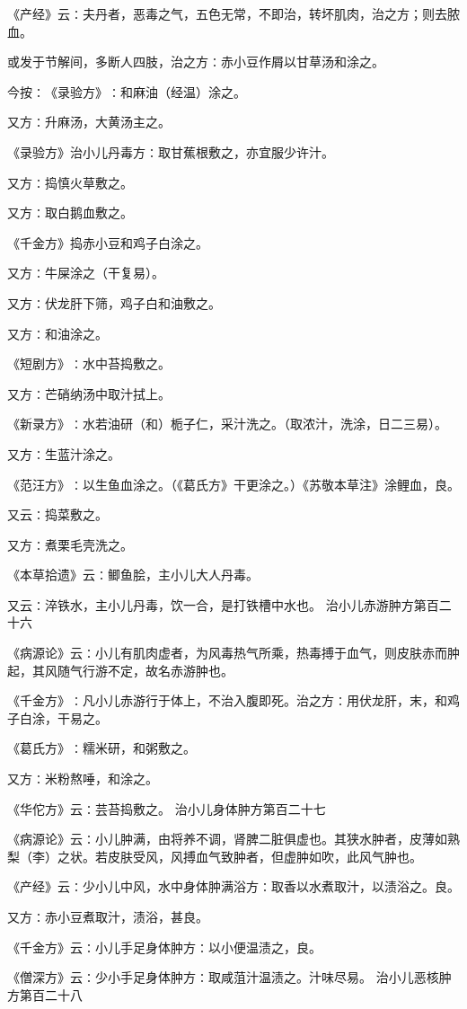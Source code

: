\documentclass[a4paper,12pt,UTF8,twoside]{ctexbook}
\begin{document}
《产经》云∶夫丹者，恶毒之气，五色无常，不即治，转坏肌肉，治之方；则去脓血。

或发于节解间，多断人四肢，治之方∶赤小豆作屑以甘草汤和涂之。

今按∶《录验方》∶和麻油（经温）涂之。

又方∶升麻汤，大黄汤主之。

《录验方》治小儿丹毒方∶取甘蕉根敷之，亦宜服少许汁。

又方∶捣慎火草敷之。

又方∶取白鹅血敷之。

《千金方》捣赤小豆和鸡子白涂之。

又方∶牛屎涂之（干复易）。

又方∶伏龙肝下筛，鸡子白和油敷之。

又方∶和油涂之。

《短剧方》∶水中苔捣敷之。

又方∶芒硝纳汤中取汁拭上。

《新录方》∶水若油研（和）栀子仁，采汁洗之。（取浓汁，洗涂，日二三易）。

又方∶生蓝汁涂之。

《范汪方》∶以生鱼血涂之。（《葛氏方》干更涂之。）《苏敬本草注》涂鲤血，良。

又云∶捣菜敷之。

又方∶煮栗毛壳洗之。

《本草拾遗》云∶鲫鱼脍，主小儿大人丹毒。

又云∶淬铁水，主小儿丹毒，饮一合，是打铁槽中水也。
治小儿赤游肿方第百二十六

《病源论》云∶小儿有肌肉虚者，为风毒热气所乘，热毒搏于血气，则皮肤赤而肿起，其风随气行游不定，故名赤游肿也。

《千金方》∶凡小儿赤游行于体上，不治入腹即死。治之方∶用伏龙肝，末，和鸡子白涂，干易之。

《葛氏方》∶糯米研，和粥敷之。

又方∶米粉熬唾，和涂之。

《华佗方》云∶芸苔捣敷之。
治小儿身体肿方第百二十七

《病源论》云∶小儿肿满，由将养不调，肾脾二脏俱虚也。其狭水肿者，皮薄如熟梨（李）之状。若皮肤受风，风搏血气致肿者，但虚肿如吹，此风气肿也。

《产经》云∶少小儿中风，水中身体肿满浴方∶取香以水煮取汁，以渍浴之。良。

又方∶赤小豆煮取汁，渍浴，甚良。

《千金方》云∶小儿手足身体肿方∶以小便温渍之，良。

《僧深方》云∶少小手足身体肿方∶取咸菹汁温渍之。汁味尽易。
治小儿恶核肿方第百二十八
\end{document}
